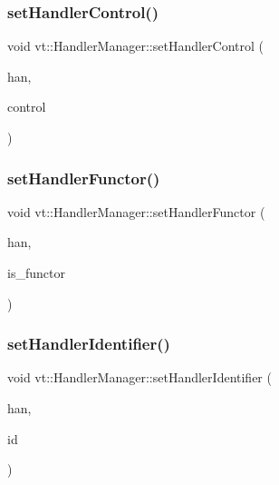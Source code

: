 \subsubsection{\texorpdfstring{set\+Handler\+Control()}{setHandlerControl()}}
{\footnotesize\ttfamily void vt\+::\+Handler\+Manager\+::set\+Handler\+Control (\begin{DoxyParamCaption}\item[{\hyperlink{namespacevt_af64846b57dfcaf104da3ef6967917573}{Handler\+Type} \&}]{han,  }\item[{\hyperlink{namespacevt_adbbef13b92f0a93b14c219b7cc8a48f2}{Handler\+Control\+Type}}]{control }\end{DoxyParamCaption})\hspace{0.3cm}{\ttfamily [static]}}

\mbox{\label{structvt_1_1_handler_manager_a25c8a39b9faea3e894021d5c6d52f903}} 
\subsubsection{\texorpdfstring{set\+Handler\+Functor()}{setHandlerFunctor()}}
{\footnotesize\ttfamily void vt\+::\+Handler\+Manager\+::set\+Handler\+Functor (\begin{DoxyParamCaption}\item[{\hyperlink{namespacevt_af64846b57dfcaf104da3ef6967917573}{Handler\+Type} \&}]{han,  }\item[{bool}]{is\+\_\+functor }\end{DoxyParamCaption})\hspace{0.3cm}{\ttfamily [static]}}

\mbox{\label{structvt_1_1_handler_manager_a5501e67dbd88836fecdf434548de0909}} 
\subsubsection{\texorpdfstring{set\+Handler\+Identifier()}{setHandlerIdentifier()}}
{\footnotesize\ttfamily void vt\+::\+Handler\+Manager\+::set\+Handler\+Identifier (\begin{DoxyParamCaption}\item[{\hyperlink{namespacevt_af64846b57dfcaf104da3ef6967917573}{Handler\+Type} \&}]{han,  }\item[{\hyperlink{namespacevt_a59ae068fe828d1c33051ff96f3d016b6}{Handler\+Identifier\+Type}}]{id }\end{DoxyParamCaption})\hspace{0.3cm}{\ttfamily [static]}}

